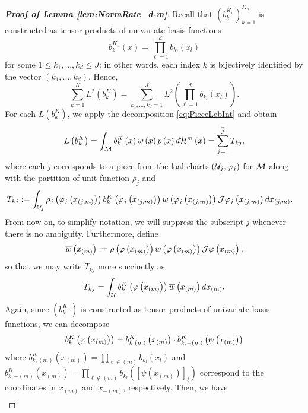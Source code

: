 \documentclass[12pt,american]{article}
\theoremstyle{definition}
\theoremstyle{plain}
\theoremstyle{definition}
\theoremstyle{plain}
\theoremstyle{plain}
\theoremstyle{plain}
\theoremstyle{plain}
\theoremstyle{plain}
\begin{document}
\begin{proof}[\textbf{Proof of Lemma \ref{lem:NormRate_d-m}}]
Recall that $\left(b_{k}^{K_{n}}\right)_{k=1}^{K_{n}}$ is constructed
as tensor products of univariate basis functions
\[
b_{k}^{K_{n}}\left(x\right)=\prod_{\ell=1}^{d}b_{k_{l}}\left(x_{l}\right)
\]
for some $1\leq k_{1},...,k_{d}\leq J$: in other words, each
index $k$ is bijectively identified by the vector $\left(k_{1},...,k_{d}\right)$.
Hence,
\[
\sum_{k=1}^{K}L^{2}\left(b_{k}^{K}\right)=\sum_{k_{1},...,k_{d}=1}^{J}L^{2}\left(\prod_{\ell=1}^{d}b_{k_{l}}\left(x_{l}\right)\right).
\]
For each ${L\left(b_{k}^{K}\right)}$, we apply
the decomposition \eqref{eq:PieceLebInt} and obtain
\[
L\left(b_{k}^{K}\right)=\int_{{\cal M}}b_{k}^{K}\left(x\right)w\left(x\right)p\left(x\right)d{\cal H}^{m}\left(x\right)
=\sum_{j=1}^{\overline{j}}T_{kj},
\]
where each $j$ corresponds to a piece from the loal charts $\left({\cal U}_{j},\varphi_{j}\right)$
for ${\cal M}$ along with the partition of unit function $\rho_{j}$
and
\begin{align*}
T_{kj} & :=\int_{{\cal {\cal U}}_{j}}\rho_{j}\left(\varphi_{j}\left(x_{\left(j,m\right)}\right)\right)b_{k}^{K}\left(\varphi_{j}\left(x_{\left(j,m\right)}\right)\right)w\left(\varphi_{j}\left(x_{\left(j,m\right)}\right)\right)\mathcal{J}\varphi_{j}\left(x_{\left(j,m\right)}\right)dx_{\left(j,m\right)}.
\end{align*}
From now on, to simplify notation, we will suppress the subscript
$j$ whenever there is no ambiguity. Furthermore, define
\[
\overline{w}\left(x_{\left(m\right)}\right):=\rho\left(\varphi\left(x_{\left(m\right)}\right)\right)w\left(\varphi\left(x_{\left(m\right)}\right)\right)\mathcal{J}\varphi\left(x_{\left(m\right)}\right),
\]
so that we may write $T_{kj}$ more succinctly as
\[
T_{kj}=\int_{{\cal {\cal U}}}b_{k}^{K}\left(\varphi\left(x_{\left(m\right)}\right)\right)\overline{w}\left(x_{\left(m\right)}\right)dx_{\left(m\right)}.
\]
Again, since $\left(b_{k}^{K_{n}}\right)$ is constructed as tensor
products of univariate basis functions, we can decompose
\[
b_{k}^{K}\left(\varphi\left(x_{\left(m\right)}\right)\right)=b_{k,\left(m\right)}^{K}\left(x_{\left(m\right)}\right)\cdot b_{k,-\left(m\right)}^{K}\left(\psi\left(x_{\left(m\right)}\right)\right)
\]
where $b_{k,\left(m\right)}^{K}\left(x_{\left(m\right)}\right)=\prod_{\ell\in\left(m\right)}b_{k_{l}}\left(x_{l}\right)$
and $b_{k,-\left(m\right)}^{K}\left(x_{\left(m\right)}\right)=\prod_{\ell\notin\left(m\right)}b_{k_{l}}\left(\left[\psi\left(x_{\left(m\right)}\right)\right]_{\ell}\right)$
correspond to the coordinates in $x_{\left(m\right)}$ and $x_{-\left(m\right)}$,
respectively. Then, we have
\begin{align*}

\end{align*}
\end{proof}
\end{document}
